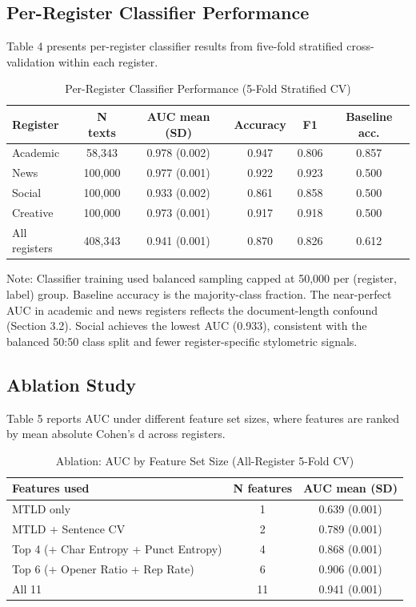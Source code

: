 \documentclass{article}
\begin{document}
\subsection{Per-Register Classifier Performance}

Table 4 presents per-register classifier results from five-fold stratified cross-validation within each register.


\begin{table}[H]
\centering
\small
\begin{tabular}{lccccc}
\toprule
\textbf{Register} & \textbf{N texts} & \textbf{AUC mean (SD)} & \textbf{Accuracy} & \textbf{F1} & \textbf{Baseline acc.} \\
\midrule
Academic & 58,343 & 0.978 (0.002) & 0.947 & 0.806 & 0.857 \\
News & 100,000 & 0.977 (0.001) & 0.922 & 0.923 & 0.500 \\
Social & 100,000 & 0.933 (0.002) & 0.861 & 0.858 & 0.500 \\
Creative & 100,000 & 0.973 (0.001) & 0.917 & 0.918 & 0.500 \\
All registers & 408,343 & 0.941 (0.001) & 0.870 & 0.826 & 0.612 \\
\bottomrule
\end{tabular}
\caption{Per-Register Classifier Performance (5-Fold Stratified CV)}
\end{table}

Note: Classifier training used balanced sampling capped at 50,000 per (register, label) group. Baseline accuracy is the majority-class fraction. The near-perfect AUC in academic and news registers reflects the document-length confound (Section 3.2). Social achieves the lowest AUC (0.933), consistent with the balanced 50:50 class split and fewer register-specific stylometric signals.

\subsection{Ablation Study}

Table 5 reports AUC under different feature set sizes, where features are ranked by mean absolute Cohen's d across registers.


\begin{table}[H]
\centering
\small
\begin{tabular}{lcc}
\toprule
\textbf{Features used} & \textbf{N features} & \textbf{AUC mean (SD)} \\
\midrule
MTLD only & 1 & 0.639 (0.001) \\
MTLD + Sentence CV & 2 & 0.789 (0.001) \\
Top 4 (+ Char Entropy + Punct Entropy) & 4 & 0.868 (0.001) \\
Top 6 (+ Opener Ratio + Rep Rate) & 6 & 0.906 (0.001) \\
All 11 & 11 & 0.941 (0.001) \\
\bottomrule
\end{tabular}
\caption{Ablation: AUC by Feature Set Size (All-Register 5-Fold CV)}
\end{table}
\end{document}
